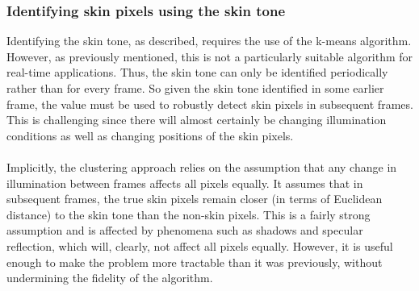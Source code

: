 \subsubsection{Identifying skin pixels using the skin tone}
Identifying the skin tone, as described, requires the use of the k-means algorithm. However, as previously mentioned, this is not a particularly suitable algorithm for real-time applications. Thus, the skin tone can only be identified periodically rather than for every frame. So given the skin tone identified in some earlier frame, the value must be used to robustly detect skin pixels in subsequent frames. This is challenging since there will almost certainly be changing illumination conditions as well as changing positions of the skin pixels.
\\ \\
Implicitly, the clustering approach relies on the assumption that any change in illumination between frames affects all pixels equally. 
It assumes that in subsequent frames, the true skin pixels remain closer (in terms of Euclidean distance) to the skin tone than the non-skin pixels.
This is a fairly strong assumption and is affected by phenomena such as shadows and specular reflection, which will, clearly, not affect all pixels equally.
However, it is useful enough to make the problem more tractable than it was previously, without undermining the fidelity of the algorithm. %
\\ \\
